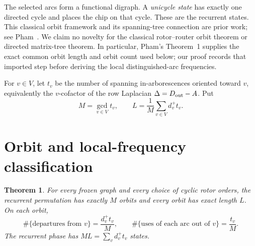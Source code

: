 \documentclass[10pt]{article}
\newtheorem{theorem}{Theorem}
\begin{document}
The selected arcs form a functional digraph.  A \emph{unicycle state} has
exactly one directed cycle and places the chip on that cycle.  These are the
recurrent states.  This classical orbit framework and its spanning-tree
connection are prior work; see Pham~\cite{pham}.  We claim no novelty for the
classical rotor--router orbit theorem or directed matrix-tree theorem.  In
particular, Pham's Theorem~1 supplies the exact common orbit length and orbit
count used below; our proof records that imported step before deriving the
local distinguished-arc frequencies.

For $v\in V$, let $t_v$ be the number of spanning in-arborescences oriented
toward $v$, equivalently the $v$-cofactor of the row Laplacian
$\Delta=D_{\rm out}-A$.  Put
\begin{equation}\label{eq:ML}
 M=\gcd_{v\in V}t_v,\qquad
 L=\frac1M\sum_{v\in V}d_v^+t_v.
\end{equation}

\section{Orbit and local-frequency classification}
\begin{theorem}\label{thm:main}
For every frozen graph and every choice of cyclic rotor orders, the recurrent
permutation has exactly $M$ orbits and every orbit has exact length $L$.  On
each orbit,
\begin{equation}\label{eq:freq}
 \#\{\text{departures from }v\}=\frac{d_v^+t_v}{M},\qquad
 \#\{\text{uses of each arc out of }v\}=\frac{t_v}{M}.
\end{equation}
The recurrent phase has $ML=\sum_vd_v^+t_v$ states.
\end{theorem}
\end{document}
